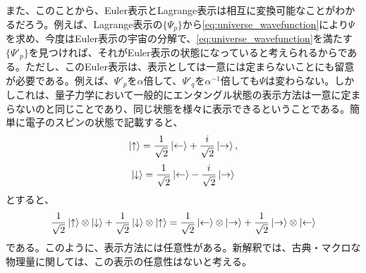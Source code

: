 また、このことから、Euler表示とLagrange表示は相互に変換可能なことがわかるだろう。例えば、Lagrange表示の$\{\Psi_p\}$から\eqref{eq:universe_wavefunction}により$\Psi$を求め、今度はEuler表示の宇宙の分解で、\eqref{eq:universe_wavefunction}を満たす$\{\Psi'_p\}$を見つければ、それがEuler表示の状態になっていると考えられるからである。ただし、このEuler表示は、表示としては一意には定まらないことにも留意が必要である。例えば、$\Psi'_p$を$\alpha$倍して、$\Psi'_q$を$\alpha^{-1}$倍しても$\Psi$は変わらない。しかしこれは、量子力学において一般的にエンタングル状態の表示方法は一意に定まらないのと同じことであり、同じ状態を様々に表示できるということである。簡単に電子のスピンの状態で記載すると、
\begin{equation}
    \ket{\uparrow}=\frac{1}{\sqrt{2}}\ket{\leftarrow}+\frac{i}{\sqrt{2}}\ket{\rightarrow},
\end{equation}
\begin{equation}
    \ket{\downarrow}=\frac{1}{\sqrt{2}}\ket{\leftarrow}-\frac{i}{\sqrt{2}}\ket{\rightarrow}
\end{equation}
とすると、
\begin{equation}
    \frac{1}{\sqrt{2}}\ket{\uparrow} \otimes \ket{\downarrow} + \frac{1}{\sqrt{2}}\ket{\downarrow} \otimes \ket{\uparrow}
    = 
    \frac{1}{\sqrt{2}}\ket{\leftarrow} \otimes \ket{\rightarrow} + \frac{1}{\sqrt{2}}\ket{\rightarrow} \otimes \ket{\leftarrow}
\end{equation}
である。このように、表示方法には任意性がある。新解釈では、古典・マクロな物理量に関しては、この表示の任意性はないと考える。
